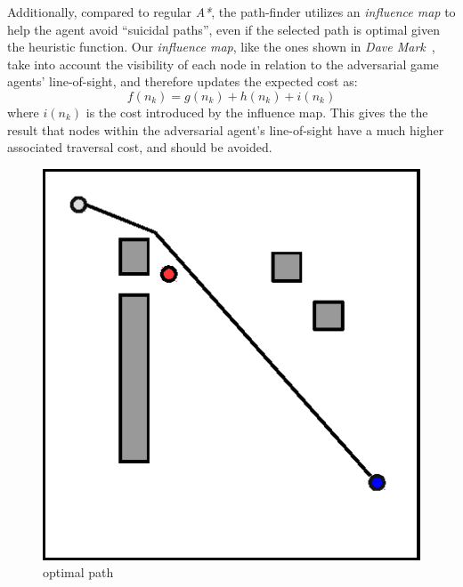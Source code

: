 \documentclass[a4paper, twocolumn]{article}
\begin{document}
    Additionally, compared to regular \emph{A*}, the path-finder utilizes an \emph{influence map} to help the agent avoid ``suicidal paths'', even if the selected path is optimal given the heuristic function. Our \emph{influence map}, like the ones shown in \emph{Dave Mark}~\cite{mark2015modular}, take into account the visibility of each node in relation to the adversarial game agents' line-of-sight, and therefore updates the expected cost as:
	\begin{equation*}
		f(n_k) = g(n_k) + h(n_k) + i(n_k)
	\end{equation*} 
    where \(i(n_k)\) is the cost introduced by the influence map. This gives the the result that nodes within the adversarial agent's line-of-sight have a much higher associated traversal cost, and should be avoided. 
    \begin{minipage}{\linewidth}        	
    \centering
	\begin{minipage}{0.45\linewidth}
	\begin{figure}[H]
        \centering
		\includegraphics[width=\linewidth]{share/bad.eps}
		\caption{optimal path}
		\label{fig:optimal_path}
        \end{figure}
	\end{minipage}
	\hspace{0.00\linewidth}

\end{minipage}
\end{document}
